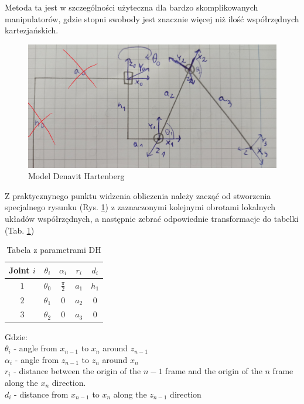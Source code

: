 \documentclass[a4paper,13pt]{article}
\begin{document}
Metoda ta jest w szczególności użyteczna dla bardzo skomplikowanych manipulatorów, gdzie stopni swobody jest znacznie więcej niż ilość współrzędnych kartezjańskich.\\

\begin{figure}[H]
\includegraphics[width=\textwidth]{img/DH_model.jpg}
\caption{Model Denavit Hartenberg}
\label{math_model_DH}
\end{figure}

Z praktycznynego punktu widzenia obliczenia należy zacząć od stworzenia specjalnego rysunku (Rys. \ref{math_model_DH}) z zaznaczonymi kolejnymi obrotami lokalnych układów współrzędnych, a następnie zebrać odpowiednie transformacje do tabelki (Tab. \ref{table:DH_table})\\

\begin{table}[h!]
\centering
\begin{tabular}{c | c c c c }
 Joint $i$ & $\theta_i$ & $\alpha_i$ & $r_i$ & $d_i$ \\
 \hline
 $1$  & $\theta_0$ & $\frac{\pi}{2}$ & $a_1$ & $h_1$ \\
 $2$  & $\theta_1$ & $0$ & $a_2$ & $0$ \\
 $3$  & $\theta_2$ & $0$ & $a_3$ & $0$ \\
\end{tabular}
\caption{Tabela z parametrami DH}
\label{table:DH_table}
\end{table}

Gdzie: \\
$\theta_i$ - angle from $x_{n-1}$ to $x_n$ around $z_{n-1}$\\
$\alpha_i$ - angle from $z_{n-1}$ to $z_n$ around $x_n$\\
$r_i$ - distance between the origin of the $n-1$ frame and the origin of the $n$ frame along the $x_n$ direction.\\ 
$d_i$ - distance from $x_{n-1}$ to $x_n$ along the $z_{n-1}$ direction\\
\end{document}
